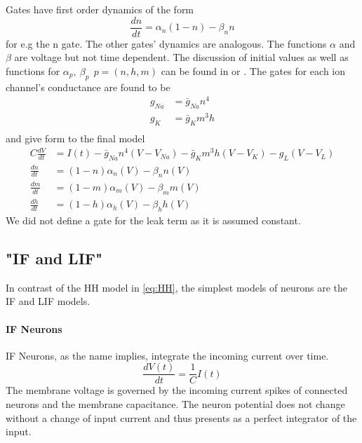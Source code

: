 Gates have first order dynamics of the form
\begin{equation}
	\frac{dn}{dt} = \alpha_n(1-n) - \beta_n n
\end{equation}
for e.g the n gate. The other gates' dynamics are analogous. The functions $\alpha$ and $\beta$ are voltage but not time dependent. The discussion of initial values as well as functions for $\alpha_p,\ \beta_p\ \ p = (n,h,m)$ can be found in \cite{hodgkin_quantitative_1952} or \cite{johnston_foundations_1995}. The gates for each ion channel's conductance are found to be
\begin{equation}
	\begin{aligned}
	g_{Na} &= \bar{g}_{Na} n^4\\
	g_{K} &= \bar{g}_{K} m^3h\\
	\end{aligned}
\end{equation}
and give form to the final model
\begin{equation}\label{eq:HH}
	\begin{aligned}
	C\frac{dV}{dt} &= I(t) -\bar{g}_{Na} n^4(V-V_{Na}) - \bar{g}_{K} m^3h(V-V_{K}) -g_L(V-V_{L})\\
	\frac{dn}{dt} &= (1-n)\alpha_n(V) - \beta_n n (V)\\
	\frac{dm}{dt} &= (1-m)\alpha_m(V) - \beta_m m (V)\\
	\frac{dh}{dt} &= (1-h)\alpha_h(V) - \beta_h h (V)
	\end{aligned}
\end{equation}
We did not define a gate for the leak term as it is assumed constant.
\subsection{"IF and LIF"}
In contrast of the \ac{HH} model in \cref{eq:HH}, the simplest models of neurons are the \ac{IF} and \ac{LIF} models.\\
\paragraph{IF Neurons}
\ac{IF} Neurons, as the name implies, integrate the incoming current over time.
\begin{equation}
	\frac{d V(t)}{d t} = \frac{1}{C}I(t)
\end{equation}
The membrane voltage is governed by the incoming current spikes of connected neurons and the membrane capacitance. The neuron potential does not change without a change of input current and thus presents as a perfect integrator of the input.\\
